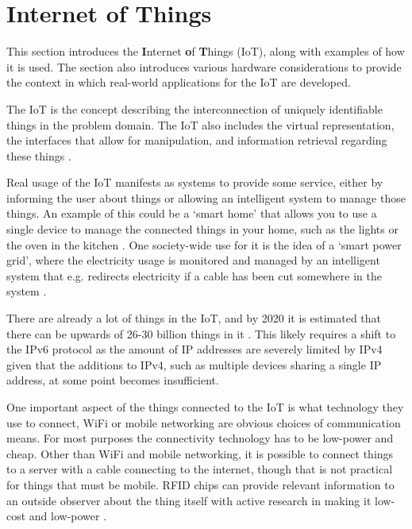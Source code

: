 \section{Internet of Things}
This section introduces the \textbf{I}nternet \textbf{o}f \textbf{T}hings (IoT), along with examples of how it is used. 
The section also introduces various hardware considerations to provide the context in which real-world applications for the IoT are developed.

The IoT is the concept describing the interconnection of uniquely identifiable things in the problem domain.
The IoT also includes the virtual representation, the interfaces that allow for manipulation, and information retrieval regarding these things \citep{misc:InternetOfThingsDefinition, misc:InternetOfThingsDefinition2, misc:InternetOfThingsDefinition3}.

Real usage of the IoT manifests as systems to provide some service, either by informing the user about things or allowing an intelligent system to manage those things.
An example of this could be a `smart home' that allows you to use a single device to manage the connected things in your home, such as the lights or the oven in the kitchen \citep{misc:InternetOfThingsExamples}.
One society-wide use for it is the idea of a `smart power grid', where the electricity usage is monitored and managed by an intelligent system that e.g. redirects electricity if a cable has been cut somewhere in the system \citep{misc:smartGrid}.

There are already a lot of things in the IoT, and by 2020 it is estimated that there can be upwards of 26-30 billion things in it \citep{misc:IoTGrowth1,misc:IoTGrowth2}.
This likely requires a shift to the IPv6 protocol as the amount of IP addresses are severely limited by IPv4 \citep{misc:numberOfAddresses} given that the additions to IPv4, such as multiple devices sharing a single IP address, at some point becomes insufficient.

One important aspect of the things connected to the IoT is what technology they use to connect, WiFi or mobile networking are obvious choices of communication means.
For most purposes the connectivity technology has to be low-power and cheap.
Other than WiFi and mobile networking, it is possible to connect things to a server with a cable connecting to the internet, though that is not practical for things that must be mobile.
RFID chips can provide relevant information to an outside observer about the thing itself \citep{misc:rfid} with active research in making it low-cost and low-power \citep{misc:rfid2}.

